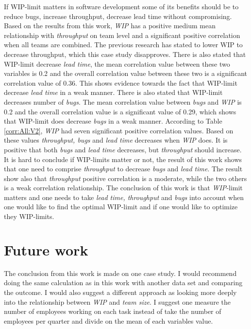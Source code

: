 \documentclass[UKenglish]{ifimaster}  %
\begin{document}
If WIP-limit matters in software development some of its benefits should be to reduce bugs, increase throughput, decrease lead time without compromising. Based on the results from this work, \textit{WIP} has a positive medium mean relationship with \textit{throughput} on team level and a significant positive correlation when all teams are combined. The previous research has stated to lower WIP to decrease throughput, which this case study disapproves. There is also stated that WIP-limit decrease \textit{lead time}, the mean correlation value between these two variables is 0.2 and the overall correlation value between these two is a significant correlation value of 0.36. This shows evidence towards the fact that WIP-limit decrease \textit{lead time} in a weak manner. There is also stated that WIP-limit decreases number of \textit{bugs}. The mean correlation value between \textit{bugs} and \textit{WIP} is 0.2 and the overall correlation value is a significant value of 0.29, which shows that WIP-limit does decrease \textit{bugs} in a weak manner.  According to Table \ref{corr:All:V2}, \textit{WIP} had seven significant positive correlation values. Based on these values \textit{throughput, bugs} and \textit{lead time} decreases when \textit{WIP} does. It is positive that both \textit{bugs} and \textit{lead time} decreases, but \textit{throughput} should increase. It is hard to conclude if WIP-limits matter or not, the result of this work shows that one need to comprise \textit{throughput} to decrease \textit{bugs} and \textit{lead time}. The result show also that \textit{throughput} positive correlation is a moderate, while the two others is a weak correlation relationship. The conclusion of this work is that \textit{WIP}-limit matters and one needs to take \textit{lead time, throughput} and \textit{bugs} into account when one would like to find the optimal WIP-limit and if one would like to optimize they WIP-limits.





\section{Future work}
The conclusion from this work is made on one case study. I would recommend doing the same calculation as in this work with another data set and comparing the outcome. I would also suggest a different approach as looking more deeply into the relationship between \textit{WIP} and  \textit{team size}. I suggest one measure the number of employees working on each task instead of take the number of employees per quarter and divide on the mean of each variables value.
\end{document}
